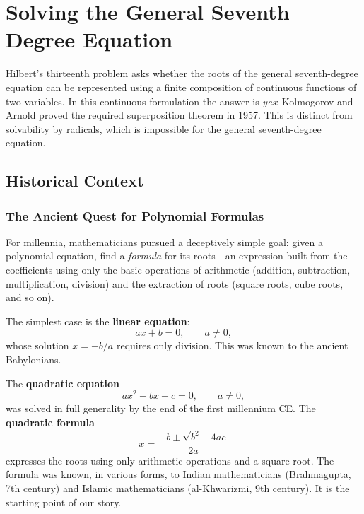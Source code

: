 
\chapter{Solving the General Seventh Degree Equation}

\begin{solvedbox}
Hilbert's thirteenth problem asks whether the roots of the general seventh-degree equation can be represented using a finite composition of continuous functions of two variables. In this continuous formulation the answer is \emph{yes}: Kolmogorov and Arnold proved the required superposition theorem in 1957. This is distinct from solvability by radicals, which is impossible for the general seventh-degree equation.
\end{solvedbox}

\section{Historical Context}

\subsection{The Ancient Quest for Polynomial Formulas}

For millennia, mathematicians pursued a deceptively simple goal: given a polynomial equation, find a \emph{formula} for its roots---an expression built from the coefficients using only the basic operations of arithmetic (addition, subtraction, multiplication, division) and the extraction of roots (square roots, cube roots, and so on).

The simplest case is the \textbf{linear equation}:
\[
    ax + b = 0, \qquad a \neq 0,
\]
whose solution $x = -b/a$ requires only division. This was known to the ancient Babylonians.

The \textbf{quadratic equation}
\[
    ax^2 + bx + c = 0, \qquad a \neq 0,
\]
was solved in full generality by the end of the first millennium CE. The \textbf{quadratic formula}
\[
    x = \frac{-b \pm \sqrt{b^2 - 4ac}}{2a}
\]
expresses the roots using only arithmetic operations and a square root. The formula was known, in various forms, to Indian mathematicians (Brahmagupta, 7th century) and Islamic mathematicians (al-Khwarizmi, 9th century). It is the starting point of our story.

